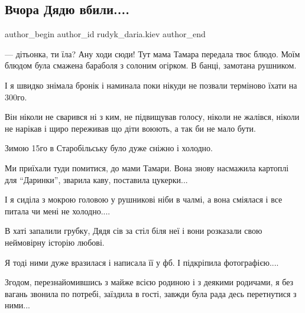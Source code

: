  
 
 
 
 
 
\subsection{Вчора Дядю вбили....}
\label{sec:09_05_2022.fb.rudyk_daria.kiev.1.vchora_djadju_vbylo}
 
\ifcmt
 author_begin
   author_id rudyk_daria.kiev
 author_end
\fi

— дітьонка, ти їла? Ану ходи сюди! Тут мама Тамара передала твоє блюдо. Моїм
блюдом була смажена бараболя з солоним огірком. В банці, замотана рушником.

І я швидко знімала бронік і наминала поки нікуди не позвали терміново їхати на
300го.

Він  ніколи не сварився ні з ким, не підвищував голосу, ніколи не жалівся,
ніколи не нарікав і щиро переживав що діти воюють, а так би не мало бути.


Зимою 15го в Старобільську було дуже сніжно і холодно.

Ми приїхали туди помитися, до мами Тамари. Вона знову насмажила картоплі для
\enquote{Даринки}, зварила каву, поставила цукерки...

І я сиділа з мокрою головою у рушникові ніби в чалмі, а вона сміялася і все
питала чи мені не холодно....


В хаті запалили грубку, Дядя сів за стіл біля неї і вони розказали свою
неймовірну історію любові. 

Я тоді ними дуже вразилася і написала її у фб. І підкріпила фотографією....

Згодом, перезнайомившись з майже всією родиною і з деякими родичами, я без
вагань звонила по потребі, заїздила в гості, завжди була рада десь перетнутися
з ними...

